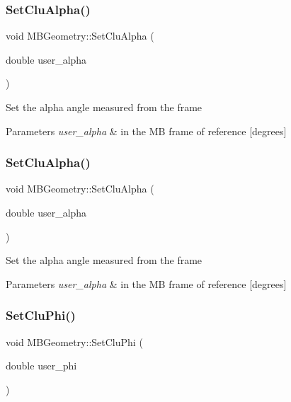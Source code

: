 \subsubsection{\texorpdfstring{Set\+Clu\+Alpha()}{SetCluAlpha()}\hspace{0.1cm}{\footnotesize\ttfamily [1/2]}}
{\footnotesize\ttfamily void M\+B\+Geometry\+::\+Set\+Clu\+Alpha (\begin{DoxyParamCaption}\item[{double}]{user\+\_\+alpha }\end{DoxyParamCaption})}

Set the alpha angle measured from the frame 
\begin{DoxyParams}{Parameters}
{\em user\+\_\+alpha} & in the MB frame of reference \mbox{[}degrees\mbox{]} \\
\hline
\end{DoxyParams}
\mbox{\label{class_m_b_geometry_a0d4868b0360a6e5534918a9813540015}} 
\subsubsection{\texorpdfstring{Set\+Clu\+Alpha()}{SetCluAlpha()}\hspace{0.1cm}{\footnotesize\ttfamily [2/2]}}
{\footnotesize\ttfamily void M\+B\+Geometry\+::\+Set\+Clu\+Alpha (\begin{DoxyParamCaption}\item[{double}]{user\+\_\+alpha }\end{DoxyParamCaption})}

Set the alpha angle measured from the frame 
\begin{DoxyParams}{Parameters}
{\em user\+\_\+alpha} & in the MB frame of reference \mbox{[}degrees\mbox{]} \\
\hline
\end{DoxyParams}
\mbox{\label{class_m_b_geometry_a74142f84cf6317d52ae39c0e0ff8a87e}} 
\subsubsection{\texorpdfstring{Set\+Clu\+Phi()}{SetCluPhi()}\hspace{0.1cm}{\footnotesize\ttfamily [1/2]}}
{\footnotesize\ttfamily void M\+B\+Geometry\+::\+Set\+Clu\+Phi (\begin{DoxyParamCaption}\item[{double}]{user\+\_\+phi }\end{DoxyParamCaption})}

